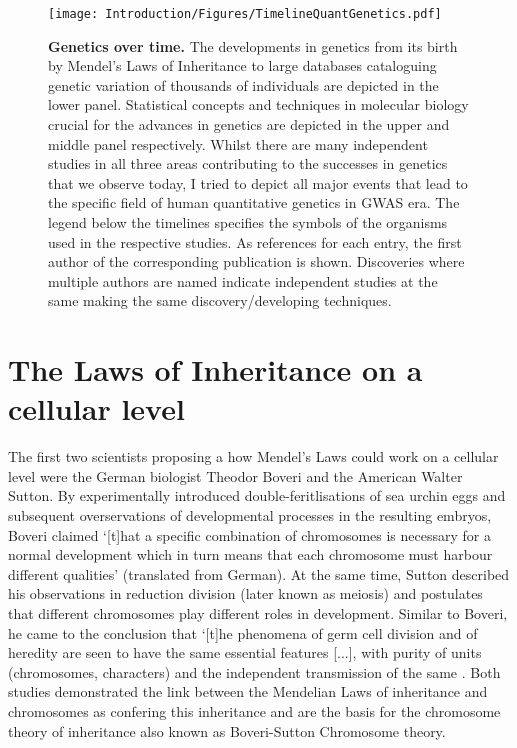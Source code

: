 \begin{figure}[hbtp]
	\centering
	\texttt{[image: Introduction/Figures/TimelineQuantGenetics.pdf]}
	\caption[\textbf{Genetics over time. }]{\textbf{Genetics over time. } The developments in genetics from its birth by Mendel's Laws of Inheritance to large databases cataloguing genetic variation of thousands of individuals are depicted in the lower panel. Statistical concepts and techniques in molecular biology crucial for the advances in genetics are depicted in the upper and middle panel respectively. Whilst there are many independent studies in all three areas contributing to the successes in genetics that we observe today, I tried to depict all major events that lead to the specific field of human quantitative genetics in GWAS era. The legend below the timelines specifies the symbols of the organisms used in the respective studies. As references for each entry, the first author of the corresponding publication is shown. Discoveries where multiple authors are named indicate independent studies at the same making the same discovery/developing techniques. } 
	 	\label{fig:timeline-genetics}
\end{figure}

\section{The Laws of Inheritance on a cellular level}
The first two scientists proposing a how Mendel's Laws could work on a cellular level were the German biologist Theodor Boveri and the American Walter Sutton. By experimentally introduced double-feritlisations of sea urchin eggs and subsequent overservations of developmental processes in the resulting embryos, Boveri claimed `[t]hat a specific combination of chromosomes is necessary for a normal development which in turn means that each chromosome must harbour different qualities' (translated from German). At the same time, Sutton described his observations in reduction division (later known as meiosis) and postulates that different chromosomes play different roles in development. Similar to Boveri, he came to the conclusion that `[t]he phenomena of germ cell division and of heredity are seen to have the same essential features [...], with purity of units (chromosomes, characters) and the independent transmission of the same \citep{Sutton1903}. Both studies demonstrated the link between the Mendelian Laws of inheritance and chromosomes as confering this inheritance and are the basis for the chromosome theory of inheritance also known as Boveri-Sutton Chromosome theory. 

